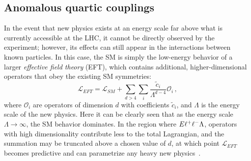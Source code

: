 \subsection{Anomalous quartic couplings}\label{ssww13tef:aqgc}
In the event that new physics exists at an energy scale far above what is currently accessible at the LHC, it cannot be directly observed by the experiment; however, its effects can still appear in the interactions between known particles.
In this case, the SM is simply the low-energy behavior of a larger \emph{effective field theory} (EFT), which contains additional, higher-dimensional operators that obey the existing SM symmetries:
\begin{equation}
  \mathcal{L}_{EFT} = \mathcal{L}_{SM}+\sum\limits_{d > 4}\sum\limits_i \frac{\tilde{c}_{i}}{\Lambda^{d-4}}\mathcal{O}_{i}\,,
  \label{eq:eft_lagrangian}
\end{equation}
where $\mathcal{O}_i$ are operators of dimension $d$ with coefficients $\tilde{c}_i$, and $\Lambda$ is the energy scale of the new physics.
Here it can be clearly seen that as the energy scale $\Lambda\rightarrow\infty$, the SM behavior dominates.
In the region where $E\muchless\Lambda$, operators with high dimensionality contribute less to the total Lagrangian, and the summation may be truncated above a chosen value of $d$, at which point $\mathcal{L}_{EFT}$ becomes predictive and can parametrize any heavy new physics~\cite{2013.aqgc-mc}.


